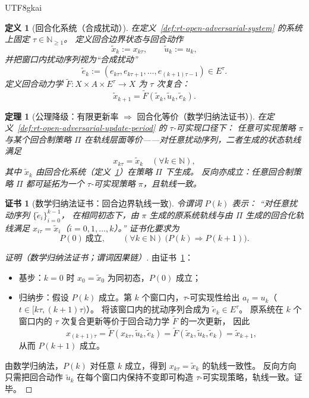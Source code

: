 \documentclass[12pt]{article}
\newtheorem{definition}{定义}[section]
\newtheorem{theorem}{定理}[section]
\newtheorem{Certificate}{证书}[section]
\newcommand{\NN}{\mathbb{N}}
\begin{document}
\begin{CJK*}{UTF8}{gkai}
\begin{definition}[回合化系统（合成扰动）]
\label{def:rt-open-adversarial-turn-system}
在定义~\ref{def:rt-open-adversarial-system} 的系统上固定 $\tau\in\NN_{\ge 1}$。
定义回合边界状态与回合动作
\[
  \tilde x_k:=x_{k\tau},\qquad \tilde u_k:=u_k,
\]
并把窗口内扰动序列视为“合成扰动”
\[
  \tilde e_k:=(e_{k\tau},e_{k\tau+1},\dots,e_{(k+1)\tau-1})\in E^\tau.
\]
定义回合动力学 $\tilde F:X\times A\times E^\tau\to X$ 为 $\tau$ 次复合：
\[
  \tilde x_{k+1}=\tilde F(\tilde x_k,\tilde u_k,\tilde e_k).
\]
\end{definition}

\begin{theorem}[公理降级：有限更新率 $\Rightarrow$ 回合化等价（数学归纳法证书）]
\label{thm:rt-open-adversarial-turn-equivalence}
在定义~\ref{def:rt-open-adversarial-update-period} 的 $\tau$-可实现口径下：
任意可实现策略 $\pi$ 与某个回合制策略 $\Pi$ 在轨线层面等价——对任意扰动序列，二者生成的状态轨线满足
\[
  x_{k\tau}=\tilde x_k\quad(\forall k\in\NN),
\]
其中 $\tilde x_k$ 由回合化系统（定义~\ref{def:rt-open-adversarial-turn-system}）在策略 $\Pi$ 下生成。
反向亦成立：任意回合制策略 $\Pi$ 都可延拓为一个 $\tau$-可实现策略 $\pi$，且轨线一致。
\end{theorem}

\begin{Certificate}[数学归纳法证书：回合边界轨线一致]
\label{cert:rt-open-adversarial-turn-equivalence}
令谓词 $P(k)$ 表示：
“对任意扰动序列 $\{\tilde e_i\}_{i=0}^{k-1}$，
在相同初态下，由 $\pi$ 生成的原系统轨线与由 $\Pi$ 生成的回合化轨线满足 $x_{i\tau}=\tilde x_i$（$i=0,1,\dots,k$）。”
证书化要求为
\[
  P(0)\ \text{成立},\qquad (\forall k\in\NN)\ \bigl(P(k)\Rightarrow P(k+1)\bigr).
\]
\end{Certificate}

\begin{proof}[证明（数学归纳法证书；谓词因果链）]
由证书~\ref{cert:rt-open-adversarial-turn-equivalence}：
\begin{itemize}
  \item 基步：$k=0$ 时 $x_0=\tilde x_0$ 为同初态，$P(0)$ 成立；
  \item 归纳步：假设 $P(k)$ 成立。第 $k$ 个窗口内，$\tau$-可实现性给出 $a_t=u_k$（$t\in[k\tau,(k+1)\tau)$）。
  将该窗口内的扰动序列合成为 $\tilde e_k\in E^\tau$。
  原系统在 $k$ 个窗口内的 $\tau$ 次复合更新等价于回合动力学 $\tilde F$ 的一次更新，
  因此
  \[
    x_{(k+1)\tau}=\tilde F(x_{k\tau},\tilde u_k,\tilde e_k)=\tilde F(\tilde x_k,\tilde u_k,\tilde e_k)=\tilde x_{k+1},
  \]
  从而 $P(k+1)$ 成立。
\end{itemize}
由数学归纳法，$P(k)$ 对任意 $k$ 成立，得到 $x_{k\tau}=\tilde x_k$ 的轨线一致性。
反向方向只需把回合动作 $\tilde u_k$ 在每个窗口内保持不变即可构造 $\tau$-可实现策略，轨线一致。证毕。
\end{proof}


\end{CJK*}
\end{document}
